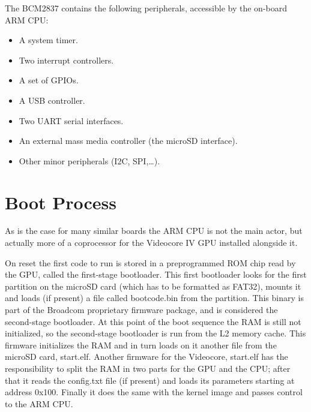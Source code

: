 \documentclass[12pt,a4paper,openright,twoside]{report}
\begin{document}
The BCM2837 contains the following peripherals, accessible by the on-board ARM CPU:
\begin{itemize}
    \item A system timer.
    \item Two interrupt controllers.
    \item A set of GPIOs.
    \item A USB controller.
    \item Two UART serial interfaces.
    \item An external mass media controller (the microSD interface).
    \item Other minor peripherals (I2C, SPI,\ldots).
\end{itemize}

\section{Boot Process}
As is the case for many similar boards the ARM CPU is not the main
actor, but actually more of a coprocessor for the Videocore IV GPU installed
alongside it.

On reset the first code to run is stored in a preprogrammed ROM chip read by the GPU,
called the first-stage bootloader. This first bootloader looks for the first
partition on the microSD card (which has to be formatted as FAT32), mounts
it and loads (if present) a file called bootcode.bin from the partition.
This binary is part of the Broadcom proprietary firmware package, and is considered
the second-stage bootloader.
At this point of the boot sequence the RAM is still not initialized, so the second-stage
bootloader is run from the L2 memory cache. This firmware initializes the RAM 
and in turn loads on it another file from the microSD card, start.elf.
Another firmware for the Videocore, start.elf has the responsibility to split 
the RAM in two parts for the GPU and the CPU; after that it reads the config.txt 
file (if present) and loads its parameters starting at address 0x100.
 Finally it does the same with the kernel image and passes control to the ARM CPU.
\end{document}
